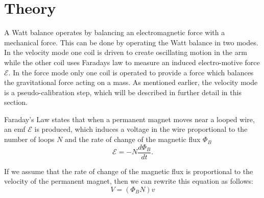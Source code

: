 \documentclass[aps,prstab,reprint,12pt]{revtex4-1}
\begin{document}



\section{Theory}\label{s:theory}

A Watt balance operates by balancing an electromagnetic force with a mechanical force. This can be done by operating the Watt balance in two modes. In the velocity mode one coil is driven to create oscillating motion in the arm while the other coil uses Faradays law to measure an induced electro-motive force $\mathscr{E}$. In the force mode only one coil is operated to provide a force which balances the gravitational force acting on a mass. As mentioned earlier, the velocity mode is a pseudo-calibration step, which will be described in further detail in this section.



Faraday's Law states that when a permanent magnet moves near a looped wire, an emf $\mathscr{E}$ is produced, which induces a voltage in the wire proportional to the number of loops $N$ and the rate of change of the magnetic flux $\Phi_B$
\begin{equation}\label{eq:Faraday}
\mathscr{E} =-N\frac{d \Phi_B}{dt}.
\end{equation}

If we assume that the rate of change of the magnetic flux is proportional to the velocity of the permanent magnet, then we can rewrite this equation as follows:
\begin{equation}\label{eq:velocity_equation}
    V=(\Phi_B N)v
\end{equation}
\end{document}
